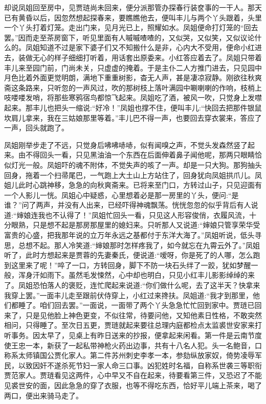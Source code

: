 

\begin{parag}
    却说凤姐回至房中，见贾琏尚未回来，便分派那管办探春行装奁事的一干人。那天已有黄昏以后，因忽然想起探春来，要瞧瞧他去，便叫丰儿与两个丫头跟着，头里一个丫头打着灯笼。走出门来，见月光已上，照耀如水。凤姐便命打灯笼的“回去罢。”因而走至茶房窗下，听见里面有人嘁嘁喳喳的，又似哭，又似笑，又似议论什么的。凤姐知道不过是家下婆子们又不知搬什么是非，心内大不受用，便命小红进去，装做无心的样子细细打听着，用话套出原委来。小红答应着去了。凤姐只带着丰儿来至园门前，门尚未关，只虚虚的掩着。于是主仆二人方推门进去，只见园中月色比着外面更觉明朗，满地下重重树影，杳无人声，甚是凄凉寂静。刚欲往秋爽斋这条路来，只听忽的一声风过，吹的那树枝上落叶满园中唰喇喇的作响，枝梢上吱喽喽发哨，将那些寒鸦宿鸟都惊飞起来。凤姐吃了酒，被风一吹，只觉身上发噤起来。那丰儿也把头一缩说:“好冷！”凤姐也撑不住，便叫丰儿:“快回去把那件银鼠坎肩儿拿来，我在三姑娘那里等着。”丰儿巴不得一声，也要回去穿衣裳来，答应了一声，回头就跑了。
\end{parag}


\begin{parag}
    凤姐刚举步走了不远，只觉身后咈咈哧哧，似有闻嗅之声，不觉头发森然竖了起来。由不得回头一看，只见黑油油一个东西在后面伸着鼻子闻他呢，那两只眼睛恰似灯光一般。凤姐吓的魂不附体，不觉失声的咳了一声。却是一只大狗。那狗抽头回身，拖着一个扫帚尾巴，一气跑上大土山上方站住了，回身犹向凤姐拱爪儿。凤姐儿此时心跳神移，急急的向秋爽斋来。已将来至门口，方转过山子，只见迎面有一个人影儿一恍。凤姐心中疑惑，心里想着必是那一房里的丫头，便问:“是谁？”问了两声，并没有人出来，已经吓得神魂飘荡。恍恍忽忽的似乎背后有人说道:“婶娘连我也不认得了！”凤姐忙回头一看，只见这人形容俊俏，衣履风流，十分眼熟，只是想不起是那房那屋里的媳妇来。只听那人又说道:“婶娘只管享荣华受富贵的心盛，把我那年说的立万年永远之基都付于东洋大海了。”凤姐听说，低头寻思，总想不起。那人冷笑道:“婶娘那时怎样疼我了，如今就忘在九霄云外了。”凤姐听了，此时方想起来是贾蓉的先妻秦氏，便说道:“嗳呀，你是死了的人哪，怎么跑到这里来了呢！”啐了一口，方转回身，脚下不防一块石头绊了一跤，犹如梦醒一般，浑身汗如雨下。虽然毛发悚然，心中却也明白，只见小红丰儿影影绰绰的来了。凤姐恐怕落人的褒贬，连忙爬起来说道:“你们做什么呢，去了这半天？快拿来我穿上罢。”一面丰儿走至跟前伏侍穿上，小红过来搀扶。凤姐道:“我才到那里，他们都睡了。咱们回去罢。”一面说，一面带了两个丫头急急忙忙回到家中。贾琏已回来了，只是见他脸上神色更变，不似往常，待要问他，又知他素日性格，不敢突然相问，只得睡了。至次日五更，贾琏就起来要往总理内庭都检点太监裘世安家来打听事务。因太早了，见桌上有昨日送来的抄报，便拿起来闲看。第一件是云南节度使王忠一本，新获了一起私带神枪火药出边事，共有十八名人犯。头一名鲍音，口称系太师镇国公贾化家人。第二件苏州刺史李孝一本，参劾纵放家奴，倚势凌辱军民，以致因奸不遂杀死节妇一家人命三口事。凶犯姓时名福，自称系世袭三等职衔贾范家人。贾琏看见这两件，心中早又不自在起来，待要看第三件，又恐迟了不能见裘世安的面，因此急急的穿了衣服，也等不得吃东西，恰好平儿端上茶来，喝了两口，便出来骑马走了。
\end{parag}


